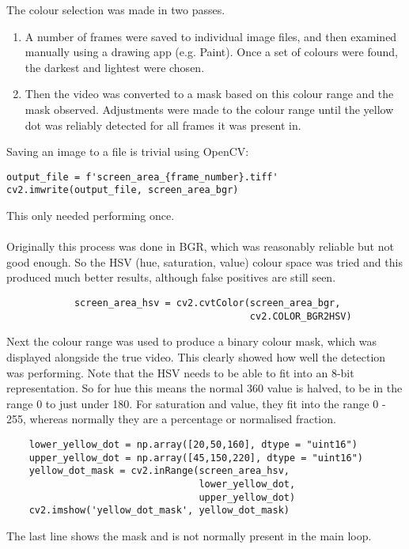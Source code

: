 \documentclass[final]{cmpreport_02}
\begin{document}
The colour selection was made in two passes.
\begin{enumerate}
	\item A number of frames were saved to individual image files, and then examined manually using a drawing app (e.g. Paint). Once a set of colours were found, the darkest and lightest were chosen.
	\item Then the video was converted to a mask based on this colour range and the mask observed. Adjustments were made to the colour range until the yellow dot was reliably detected for all frames it was present in.
\end{enumerate}
\noindent
Saving an image to a file is trivial using OpenCV:
\begin{verbatim}
output_file = f'screen_area_{frame_number}.tiff'
cv2.imwrite(output_file, screen_area_bgr)
\end{verbatim}
This only needed performing once.
\\\\
Originally this process was done in BGR, which was reasonably reliable but not good enough. So the HSV (hue, saturation, value) colour space was tried and this produced much better results, although false positives are still seen.
\begin{verbatim}
	        screen_area_hsv = cv2.cvtColor(screen_area_bgr,
	                                       cv2.COLOR_BGR2HSV)
\end{verbatim}
Next the colour range was used to produce a binary colour mask, which was displayed alongside the true video. This clearly showed how well the detection was performing. Note that the HSV needs to be able to fit into an 8-bit representation. So for hue this means the normal 360 value is halved, to be in the range 0 to just under 180. For saturation and value, they fit into the range 0 - 255, whereas normally they are a percentage or normalised fraction.
\begin{verbatim}
	lower_yellow_dot = np.array([20,50,160], dtype = "uint16")
	upper_yellow_dot = np.array([45,150,220], dtype = "uint16")
	yellow_dot_mask = cv2.inRange(screen_area_hsv,
	                              lower_yellow_dot,
	                              upper_yellow_dot)
	cv2.imshow('yellow_dot_mask', yellow_dot_mask)
\end{verbatim}
\noindent
The last line shows the mask and is not normally present in the main loop.
\end{document}
